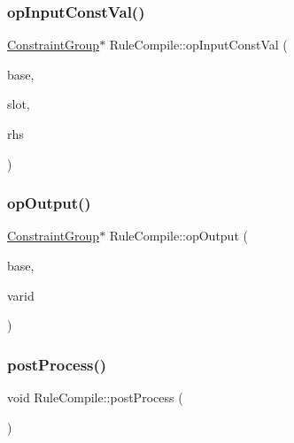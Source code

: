\mbox{\label{class_rule_compile_a67d75997f4902ef6db8719a44a7a0617}} 
\subsubsection{\texorpdfstring{opInputConstVal()}{opInputConstVal()}}
{\footnotesize\ttfamily \mbox{\hyperlink{class_constraint_group}{Constraint\+Group}}$\ast$ Rule\+Compile\+::op\+Input\+Const\+Val (\begin{DoxyParamCaption}\item[{\mbox{\hyperlink{class_constraint_group}{Constraint\+Group}} $\ast$}]{base,  }\item[{int8 $\ast$}]{slot,  }\item[{\mbox{\hyperlink{class_r_h_s_constant}{R\+H\+S\+Constant}} $\ast$}]{rhs }\end{DoxyParamCaption})}

\mbox{\label{class_rule_compile_aa260ec5e4713a9c56086260609a8a835}} 
\subsubsection{\texorpdfstring{opOutput()}{opOutput()}}
{\footnotesize\ttfamily \mbox{\hyperlink{class_constraint_group}{Constraint\+Group}}$\ast$ Rule\+Compile\+::op\+Output (\begin{DoxyParamCaption}\item[{\mbox{\hyperlink{class_constraint_group}{Constraint\+Group}} $\ast$}]{base,  }\item[{int4}]{varid }\end{DoxyParamCaption})}

\mbox{\label{class_rule_compile_a7331ae343b99b61b6c11b8060c362a4e}} 
\subsubsection{\texorpdfstring{postProcess()}{postProcess()}}
{\footnotesize\ttfamily void Rule\+Compile\+::post\+Process (\begin{DoxyParamCaption}\item[{void}]{ }\end{DoxyParamCaption})}

